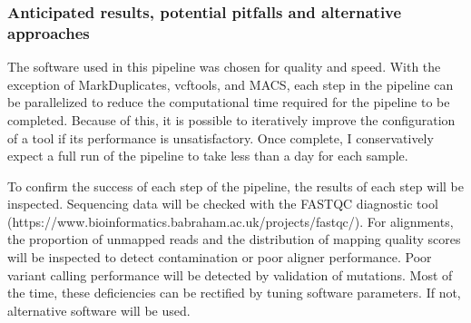 







\subsubsection{Anticipated results, potential pitfalls and alternative approaches}

The software used in this pipeline was chosen for quality and speed. With the exception of MarkDuplicates, vcftools, and MACS, each step in the pipeline can be parallelized to reduce the computational time required for the pipeline to be completed. Because of this, it is possible to iteratively improve the configuration of a tool if its performance is unsatisfactory. Once complete, I conservatively expect a full run of the pipeline to take less than a day for each sample.

To confirm the success of each step of the pipeline, the results of each step will be inspected. Sequencing data will be checked with the FASTQC diagnostic tool (https://www.bioinformatics.babraham.ac.uk/projects/fastqc/).
For alignments, the proportion of unmapped reads and the distribution of mapping quality scores will be inspected to detect contamination or poor aligner performance. Poor variant calling performance will be detected by validation of mutations. Most of the time, these deficiencies can be rectified by tuning software parameters. If not, alternative software will be used.

